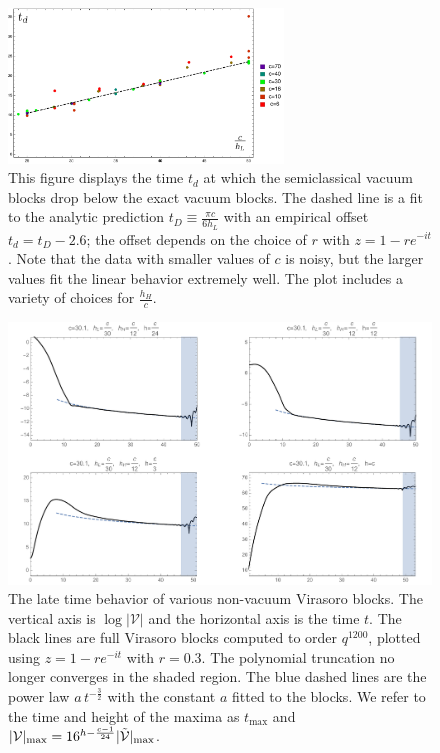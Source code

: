 \begin{figure}[h]
\begin{centering}
\includegraphics[width=0.65\textwidth]{virasoro_chapter/depTimePlot}
\caption[Departure times of exact blocks from semiclassical ones as a function of $c$]{This figure displays the time $t_d$ at which the semiclassical vacuum blocks drop below the exact vacuum blocks.  The dashed line is a fit to the analytic prediction $t_D \equiv \frac{\pi c}{6 h_L}$ with an empirical offset $t_d = t_D -  2.6$; the offset depends on the choice of $r$ with $z = 1 - r e^{-it}$. Note that the data with smaller values of $c$ is noisy, but the larger values fit the linear behavior extremely well.  The plot includes a variety of choices for $\frac{h_H}{c}$. 
\label{fig:td}}
\par\end{centering}
\end{figure}

\begin{figure}[h]
\centering{}\includegraphics[scale=0.5]{virasoro_chapter/NonVBlock}
\caption[Late time behavior of various non-vacuum Virasoro blocks]{The late time behavior of various non-vacuum Virasoro blocks. The vertical axis is $\log|\mathcal{V}|$ and the horizontal axis is the time $t$. The black lines are full Virasoro blocks computed to order $q^{1200}$, plotted using $z = 1 - r e^{-it}$ with $r=0.3$. The polynomial truncation no longer converges  in the shaded region. The blue dashed lines are the power law $a \, t^{-\frac{3}{2}}$ with the constant $a$ fitted to the blocks. We refer to the time and height  of the maxima as $t_{\max}$ and $|{\cal V}|_{\max} = 16^{h - \frac{c-1}{24}} |\tilde {{\cal V}}|_{\max}$.
\label{NonVBlock}}
\end{figure}



